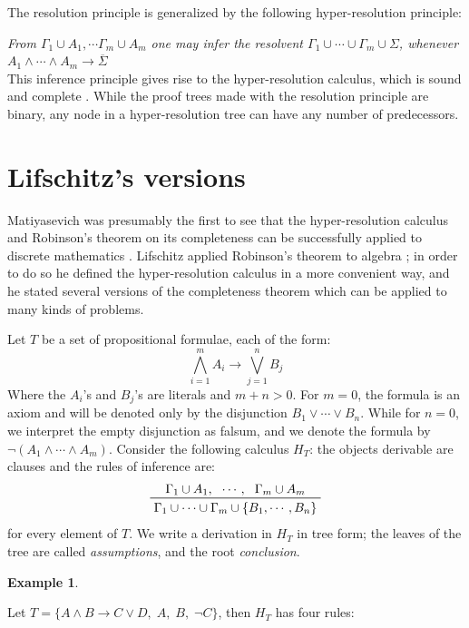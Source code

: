 \documentclass[a4paper,12pt,oneside]{book}
\newtheorem{example}[theorem]{Example}
\let\o\vee
\let\e\wedge
\begin{document}
\newpage\noindent
The resolution principle is generalized by the following hyper-resolution principle:

\textit{From $\Gamma_1\cup A_1,\cdots\Gamma_m\cup A_m $ one may infer the resolvent $\Gamma_1\cup\cdots\cup\Gamma_m\cup \Sigma$, whenever $A_1\e\cdots\e A_m\rightarrow \overline{\Sigma}$}\\  
This inference principle gives rise to the hyper-resolution calculus, which is sound and complete \cite{rob,robinson-general}. While the proof trees made with the resolution principle are binary, any node in a hyper-resolution tree can have any number of predecessors.


\section{Lifschitz's versions}
Matiyasevich was presumably the first to see that the hyper-resolution calculus and Robinson's theorem on its completeness can be successfully applied to discrete mathematics \cite{mat-1,mat-2}. Lifschitz applied Robinson's theorem to algebra \cite{lifschitz}; in order to do so  he defined the hyper-resolution calculus in a more convenient way, and he stated several versions of the completeness theorem which can be applied to many kinds of problems.

Let $T$ be a set of propositional formulae, each of the form:
\begin{equation}\label{prototipo}
\bigwedge_{i=1}^m A_i \rightarrow \bigvee_{j=1}^n B_j 
\end{equation}
Where the $A_i$'s and $B_j$'s are literals and $m+n>0$. For $m=0$, the formula is an axiom and will be denoted only by the disjunction $B_1\o\cdots\o B_n$. While for $n=0$, we interpret the empty disjunction as falsum, and we denote the formula by $\neg (A_1\e\cdots\e A_m)$.
Consider the following calculus $H_T$: the objects derivable are clauses and the rules of inference are:
\begin{equation}\label{axiom}
\prftree{\Gamma_1 \cup A_1 ,} {\cdots,} {\Gamma_m \cup A_m } 
{\Gamma_1\cup\cdots\cup\Gamma_m\cup\{ B_1 ,\cdots ,B_n\}}
\end{equation}
for every element of $T$. We write a derivation in $H_T$ in tree form; the leaves of the tree are called \textit{assumptions}, and the root \textit{conclusion}.


\noindent\begin{example}
\end{example} Let $T=\{ A \e B \rightarrow C \o D ,\; A,\; B,\; \neg C \}$, then $H_T$ has four rules:
\end{document}
